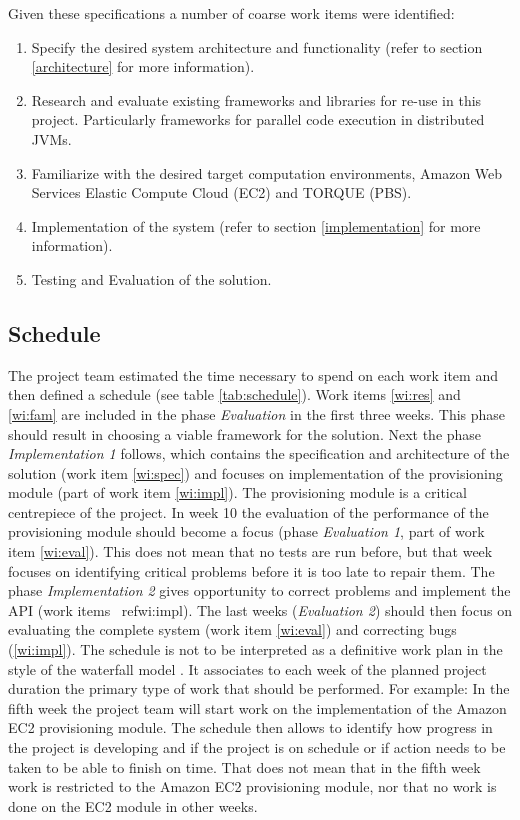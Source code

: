 \documentclass[english]{uzhpub}
\begin{document}
Given these specifications a number of coarse work items were identified:
\begin{enumerate}
\item \label{wi:spec}Specify the desired system architecture and functionality (refer to section \ref{architecture} for more information).
\item \label{wi:res}Research and evaluate existing frameworks and libraries for re-use in this project. Particularly frameworks for parallel code execution in distributed JVMs.
\item \label{wi:fam}Familiarize with the desired target computation environments, Amazon Web Services Elastic Compute Cloud (EC2) and TORQUE (PBS).
\item \label{wi:impl}Implementation of the system (refer to section \ref{implementation} for more information).
\item \label{wi:eval}Testing and Evaluation of the solution.
\end{enumerate}

\subsection{Schedule}

The project team estimated the time necessary to spend on each work item and then defined a schedule (see table \ref{tab:schedule}). Work items \ref{wi:res} and \ref{wi:fam} are included in the phase \emph{Evaluation} in the first three weeks. This phase should result in choosing a viable framework for the solution. Next the phase \emph{Implementation 1} follows, which contains the specification and architecture of the solution (work item \ref{wi:spec}) and focuses on implementation of the provisioning module (part of work item \ref{wi:impl}). The provisioning module is a critical centrepiece of the project. In week 10 the evaluation of the performance of the provisioning module should become a focus (phase \emph{Evaluation 1}, part of work item \ref{wi:eval}). This does not mean that no tests are run before, but that week focuses on identifying critical problems before it is too late to repair them. The phase \emph{Implementation 2} gives opportunity to correct problems and implement the API (work items \
ref{wi:impl}). The last weeks (\emph{Evaluation 2}) should then focus on evaluating the complete system (work item \ref{wi:eval}) and correcting bugs (\ref{wi:impl}). The schedule is not to be interpreted as a definitive work plan in the style of the waterfall model \cite{waterfall-wiki}. It associates to each week of the planned project duration the primary type of work that should be performed. For example: In the fifth week the project team will start work on the implementation of the Amazon EC2 provisioning module. The schedule then allows to identify how progress in the project is developing and if the project is on schedule or if action needs to be taken to be able to finish on time. That does not mean that in the fifth week work is restricted to the Amazon EC2 provisioning module, nor that no work is done on the EC2 module in other weeks.
\end{document}

